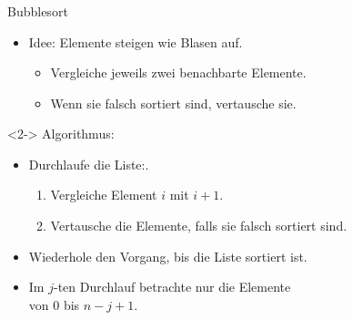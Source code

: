 \begin{frame}
\frametitle{\insertsection}
\begin{block}
{Bubblesort}
\begin{itemize}
	\item Idee: Elemente steigen wie Blasen auf.
	\begin{itemize}
		\item Vergleiche jeweils zwei benachbarte Elemente.
		\item Wenn sie falsch sortiert sind, vertausche sie.
	\end{itemize}
\end{itemize}
\end{block}
\begin{block}<2->
{Algorithmus:}
\begin{itemize}
	\item Durchlaufe die Liste:.
	\begin{enumerate}
		\item Vergleiche Element $i$ mit $i+1$.
		\item Vertausche die Elemente, falls sie falsch sortiert sind.
	\end{enumerate}
	\item Wiederhole den Vorgang, bis die Liste sortiert ist.
	\item Im $j$-ten Durchlauf betrachte nur die Elemente \\ von $0$ bis $n-j+1$.
\end{itemize}
\end{block}
\end{frame}


\endinput

\begin{frame}
\frametitle{\insertsection}
\begin{block}
{}
\end{block}
\end{frame}